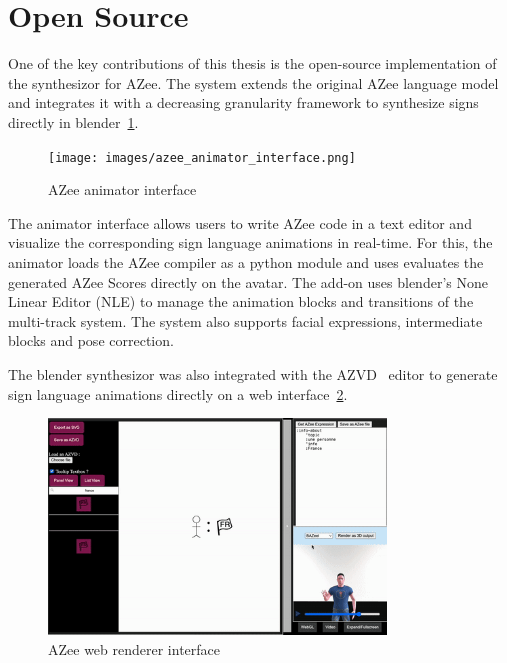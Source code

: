 \documentclass[../../main.tex]{subfiles}
\begin{document}
\section{Open Source}
\label{ch:conclusion:opensource}

One of the key contributions of this thesis is the open-source implementation of the synthesizor for AZee. The system extends the original AZee language model and integrates it with a decreasing granularity framework to synthesize signs directly in blender~\ref{fig:azee_animator_interface}.

\begin{figure}[ht]
    \centering
    \texttt{[image: images/azee\_animator\_interface.png]}
    \caption{AZee animator interface}
    \label{fig:azee_animator_interface}
\end{figure}

The animator interface allows users to write AZee code in a text editor and visualize the corresponding sign language animations in real-time. For this, the animator loads the AZee compiler as a python module and uses evaluates the generated AZee Scores directly on the avatar. The add-on uses blender's None Linear Editor (NLE) to manage the animation blocks and transitions of the multi-track system. The system also supports facial expressions, intermediate blocks and pose correction.

The blender synthesizor was also integrated with the AZVD~\cite{azvd} editor to generate sign language animations directly on a web interface~\ref{fig:azee_web_interface}.

\begin{figure}[ht]
    \centering
    \includegraphics[width=0.8\textwidth]{images/azee_web_interface.png}
    \caption{AZee web renderer interface}
    \label{fig:azee_web_interface}
\end{figure}
\end{document}
